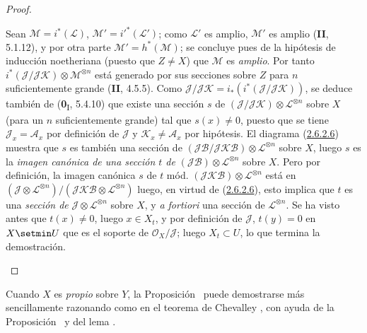 \begin{proof}
\begin{env}[2.6.2.5]
Sean $\mathcal M=i^*(\mathcal L)$, $\mathcal M'=i'^*(\mathcal L')$;
como $\mathcal L'$ es amplio, $\mathcal M'$ es amplio (\textbf{II}, 5.1.12), y
por otra parte $\mathcal M'=h^*(\mathcal M)$; se concluye pues de
la hipótesis de inducción noetheriana (puesto que $Z\neq X$) que
$\mathcal M$ es \emph{amplio}. Por tanto
$i^*(\mathcal J/\mathcal J\mathcal K)\otimes\mathcal M^{\otimes n}$ está
generado por sus secciones sobre $Z$ para $n$ suficientemente grande
(\textbf{II}, 4.5.5). Como
$\mathcal J/\mathcal J\mathcal K=i_*(i^*(\mathcal J/\mathcal J\mathcal K))$,
se deduce también de (\textbf{0}\textsubscript{I}, 5.4.10) que existe una sección
$s$ de $(\mathcal J/\mathcal J\mathcal K)\otimes
\mathcal L^{\otimes n}$ sobre $X$ (para un $n$ suficientemente grande) tal
que $s(x)\neq0$, puesto que se tiene $\mathcal J_x=\mathcal A_x$ por
definición de $\mathcal J$ y $\mathcal K_x\neq\mathcal A_x$ por
hipótesis. El diagrama (\hyperref[III.2.6.2.6-fr]{2.6.2.6}) muestra que
$s$ es también una sección de
$(\mathcal J\mathcal B/\mathcal J\mathcal K\mathcal B)
\otimes\mathcal L^{\otimes n}$ sobre $X$, luego $s$ es la \emph{imagen
canónica de una sección $t$ de}
$(\mathcal J\mathcal B)\otimes\mathcal L^{\otimes n}$ sobre $X$.
Pero por definición, la imagen canónica $s$ de $t$ mód.
$(\mathcal J\mathcal K\mathcal B)\otimes\mathcal L^{\otimes n}$ está
en
$(\mathcal J\otimes\mathcal L^{\otimes n})/
(\mathcal J\mathcal K\mathcal B\otimes\mathcal L^{\otimes n})$
luego, en virtud de (\hyperref[III.2.6.2.6-fr]{2.6.2.6}), esto implica que
$t$ es una \emph{sección de} $\mathcal J\otimes\mathcal L^{\otimes n}$
sobre $X$, y \emph{a fortiori} una sección de
$\mathcal L^{\otimes n}$. Se ha visto antes que $t(x)\neq0$, luego
$x\in X_t$, y por definición de $\mathcal J$, $t(y)=0$ en $X\setmin U$ que
es el soporte de $\mathcal O_X/\mathcal J$; luego $X_t\subset U$, lo que
termina la demostración.
\end{env}
\end{proof}


\begin{remark}[2.6.3]
\label{III.2.6.3}
\label{III.2.6.3-fr}
Cuando $X$ es \emph{propio} sobre $Y$, la Proposición~ puede demostrarse
más sencillamente razonando como en el teorema de Chevalley
, con ayuda de la Proposición~ y
del lema .
\end{remark}
